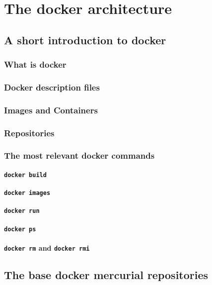 \chapter{The docker architecture}
	\section{A short introduction to docker}
		\subsection{What is docker}
		\subsection{Docker description files}
		\subsection{Images and Containers}
		\subsection{Repositories}
		\subsection{The most relevant docker commands}
			\subsubsection{\texttt{docker build}}
			\subsubsection{\texttt{docker images}}
			\subsubsection{\texttt{docker run}}
			\subsubsection{\texttt{docker ps}}
			\subsubsection{\texttt{docker rm} and \texttt{docker rmi}}
	\section{The base docker mercurial repositories}
